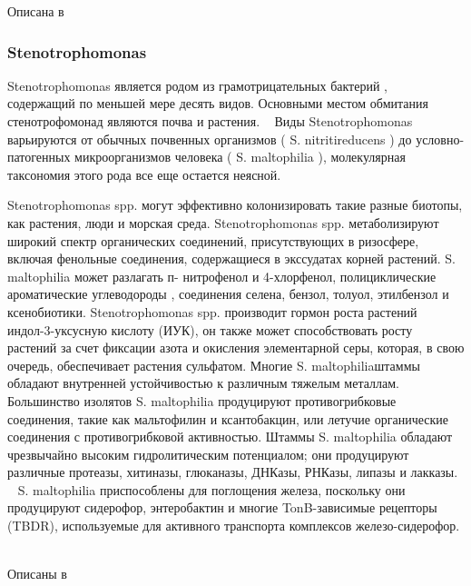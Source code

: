 \documentclass[11pt]{article}
\begin{document}
	Описана в ~\cite{Pseudomonas_putiida_1,Pseudomonas_putiida_2,Pseudomonas_putiida_3,Pseudomonas_putiida_4,Pseudomonas_putiida_5,Pseudomonas_putiida_6,Pseudomonas_putiida_7,Pseudomonas_putiida_8,Pseudomonas_putiida_9,Pseudomonas_putiida_10,Pseudomonas_putiida_11, Pseudomonas_putiida_12 }
	
	\subsubsection{Stenotrophomonas}
	Stenotrophomonas является родом из грамотрицательных бактерий ,  ~\cite{Stenotrophomonas_2} содержащий по меньшей мере десять видов. Основными местом обмитания стенотрофомонад являются почва и растения. ~\cite{Stenotrophomonas_3} Виды Stenotrophomonas варьируются от обычных почвенных организмов ( S. nitritireducens ) до условно-патогенных микроорганизмов человека ( S. maltophilia ), молекулярная таксономия этого рода все еще остается неясной. ~\cite{Stenotrophomonas_4}
	
	Stenotrophomonas spp. могут эффективно колонизировать такие разные биотопы, как растения, люди и морская среда. Stenotrophomonas spp. метаболизируют широкий спектр органических соединений, присутствующих в ризосфере, включая фенольные соединения, содержащиеся в экссудатах корней растений. S. maltophilia может разлагать п- нитрофенол и 4-хлорфенол, полициклические ароматические углеводороды , соединения селена, бензол, толуол, этилбензол и ксенобиотики. Stenotrophomonas spp. производит гормон роста растений индол-3-уксусную кислоту (ИУК), он также может способствовать росту растений за счет фиксации азота и окисления элементарной серы, которая, в свою очередь, обеспечивает растения сульфатом. Многие S. maltophiliaштаммы обладают внутренней устойчивостью к различным тяжелым металлам. ~\cite{Stenotrophomonas_3} Большинство изолятов S. maltophilia продуцируют противогрибковые соединения, такие как мальтофилин и ксантобакцин, или летучие органические соединения с противогрибковой активностью. Штаммы S. maltophilia обладают чрезвычайно высоким гидролитическим потенциалом; они продуцируют различные протеазы, хитиназы, глюканазы, ДНКазы, РНКазы, липазы и лакказы. ~\cite{Stenotrophomonas_3} S. maltophilia приспособлены для поглощения железа, поскольку они продуцируют сидерофор, энтеробактин и многие TonB-зависимые рецепторы (TBDR), используемые для активного транспорта комплексов железо-сидерофор. ~\cite{Stenotrophomonas_3}
	
	Описаны в ~\cite{Stenotrophomonas_1,Stenotrophomonas_2,Stenotrophomonas_3,Stenotrophomonas_4,Stenotrophomonas_5,Stenotrophomonas_6,Stenotrophomonas_7, Stenotrophomonas_8}
	
\end{document}
